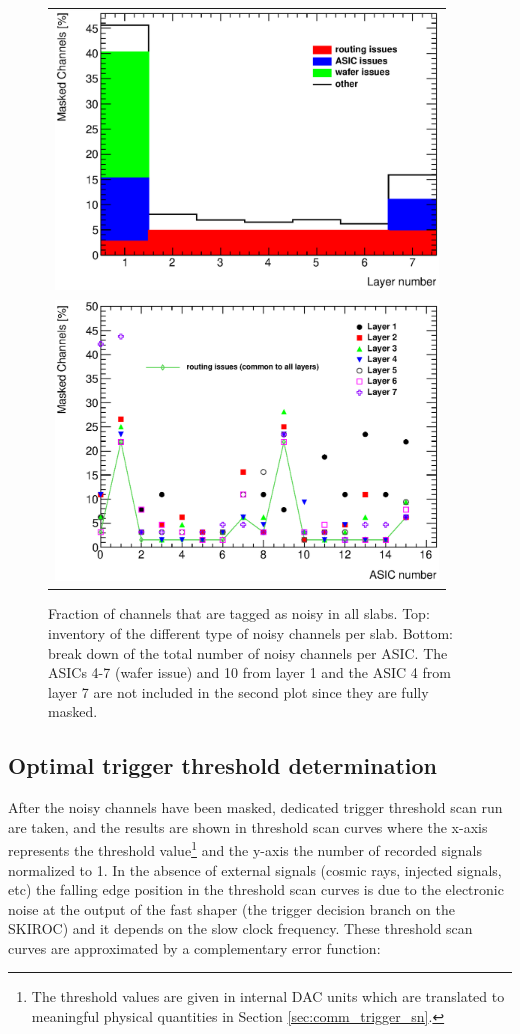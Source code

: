 \documentclass[a4paper,11pt]{article}
\begin{document}
\begin{figure}[!t]
  \centering
  \begin{tabular}{l}
  \includegraphics[width=4in]{../figs/commissioning/masked_layer.eps} \\
  \includegraphics[width=4in]{../figs/commissioning/masked_chip.eps}
  \end{tabular}
\caption{Fraction of channels that are tagged as noisy in all slabs. 
Top: inventory of the different type of noisy channels per slab. 
Bottom: break down of the total number of noisy channels per ASIC. 
The ASICs 4-7 (wafer issue) and 10 from layer 1 and the ASIC 4 from layer 7 are not included
in the second plot since they are fully masked.}
\label{noisycells}
\end{figure}


\subsection{Optimal trigger threshold determination}
\label{sec:comm_trigger}

After the noisy channels have been masked, dedicated trigger threshold
scan run are taken, and the results are shown in threshold scan curves where the
x-axis represents the threshold value\footnote{The threshold values are given in internal DAC units which are translated to
meaningful physical quantities in Section \ref{sec:comm_trigger_sn}.} and the y-axis
the number of recorded signals normalized to 1.
In the absence of external signals (cosmic rays, injected signals, etc) 
the falling edge position in the threshold scan curves
is due to the electronic noise
at the output of the fast shaper (the trigger decision branch on the SKIROC)
and it depends on the slow clock frequency.
These threshold scan curves are approximated by a complementary error function:
\end{document}
